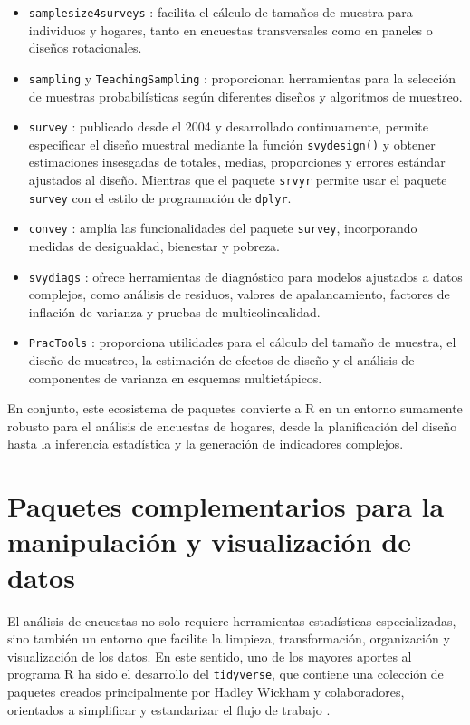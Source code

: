 \documentclass[
  spanish,
  12pt,
]{book}
\begin{document}
\begin{itemize}
\item
  \texttt{samplesize4surveys} \citep{Gutierrez2020}: facilita el cálculo de tamaños de muestra para individuos y hogares, tanto en encuestas transversales como en paneles o diseños rotacionales.
\item
  \texttt{sampling} \citep{Tille2025} y \texttt{TeachingSampling} \citep{GutierrezT2020}: proporcionan herramientas para la selección de muestras probabilísticas según diferentes diseños y algoritmos de muestreo.
\item
  \texttt{survey} \citep{Lumley2024}: publicado desde el 2004 y desarrollado continuamente, permite especificar el diseño muestral mediante la función \texttt{svydesign()} y obtener estimaciones insesgadas de totales, medias, proporciones y errores estándar ajustados al diseño. Mientras que el paquete \texttt{srvyr} \citep{Freedman2024} permite usar el paquete \texttt{survey} con el estilo de programación de \texttt{dplyr}.
\item
  \texttt{convey} \citep{covey2024}: amplía las funcionalidades del paquete \texttt{survey}, incorporando medidas de desigualdad, bienestar y pobreza.
\item
  \texttt{svydiags} \citep{Valliant2024}: ofrece herramientas de diagnóstico para modelos ajustados a datos complejos, como análisis de residuos, valores de apalancamiento, factores de inflación de varianza y pruebas de multicolinealidad.
\item
  \texttt{PracTools} \citep{Valliant2025}: proporciona utilidades para el cálculo del tamaño de muestra, el diseño de muestreo, la estimación de efectos de diseño y el análisis de componentes de varianza en esquemas multietápicos.
\end{itemize}

En conjunto, este ecosistema de paquetes convierte a R en un entorno sumamente robusto para el análisis de encuestas de hogares, desde la planificación del diseño hasta la inferencia estadística y la generación de indicadores complejos.

\section{Paquetes complementarios para la manipulación y visualización de datos}\label{paquetes-complementarios-para-la-manipulaciuxf3n-y-visualizaciuxf3n-de-datos}

El análisis de encuestas no solo requiere herramientas estadísticas especializadas, sino también un entorno que facilite la limpieza, transformación, organización y visualización de los datos. En este sentido, uno de los mayores aportes al programa R ha sido el desarrollo del \texttt{tidyverse}, que contiene una colección de paquetes creados principalmente por Hadley Wickham y colaboradores, orientados a simplificar y estandarizar el flujo de trabajo \citep{Wickham2019, Wickham2023, WickhamGrolemund2017}.
\end{document}
